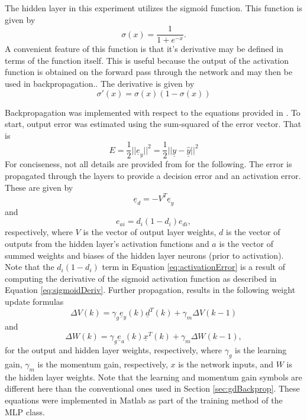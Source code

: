 \documentclass[11pt,pdftex,portrait,letterpaper]{article}
\begin{document}
The hidden layer in this experiment utilizes the sigmoid function. This function is given by
\begin{equation}\label{eq:sigmoid}
    \sigma(x) = \frac{1}{1+e^{-x}}.
\end{equation}
A convenient feature of this function is that it's derivative may be defined in terms of the function itself. This is useful because the output of the activation function is obtained on the forward pass through the network and may then be used in backpropagation.. The derivative is given by
\begin{equation}\label{eq:sigmoidDeriv}
    \sigma'(x)=\sigma(x) \left(1-\sigma(x)\right)
\end{equation}

Backpropagation was implemented with respect to the equations provided in \cite{qiao2024artificial}. To start, output error was estimated using the sum-squared of the error vector. That is
\begin{equation}
    E=\frac{1}{2}||\underline{e}_y||^2=\frac{1}{2}||\underline{y}-\underline{\hat{y}}||^2
\end{equation}
For conciseness, not all details are provided from \cite{qiao2024artificial} for the following. The error is propagated through the layers to provide a decision error and an activation error. These are given by
\begin{equation}\label{eq:decisionError}
    \underline{e}_d=-V^T\underline{e}_y
\end{equation}
and
\begin{equation}\label{eq:activationError}
    e_{ai}=d_i(1-d_i)e_{di},
\end{equation}
respectively, where $V$ is the vector of output layer weights, $d$ is the vector of outputs from the hidden layer's activation functions and $a$ is the vector of summed weights and biases of the hidden layer neurons (prior to activation). Note that the $d_i(1-d_i)$ term in Equation \ref{eq:activationError} is a result of computing the derivative of the sigmoid activation function as described in Equation \ref{eq:sigmoidDeriv}. Further propagation, results in the following weight update formulas
\begin{equation}
    \Delta V(k)=\gamma_g\underline{e}_y(k)\underline{d}^T(k)+\gamma_m\Delta V(k-1)
\end{equation}
and
\begin{equation}
    \Delta W(k)=\gamma_g\underline{e}_a(k)\underline{x}^T(k)+\gamma_m\Delta W(k-1),
\end{equation}
for the output and hidden layer weights, respectively, where $\gamma_g$ is the learning gain, $\gamma_m$ is the momentum gain, respectively, $x$ is the network inputs, and $W$ is the hidden layer weights. Note that the learning and momentum gain symbols are different here than the  conventional ones used in Section \ref{sec:gdBackprop}. These equations were implemented in Matlab as part of the training method of the MLP class.
\end{document}
